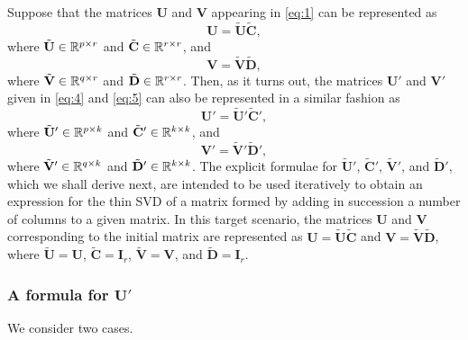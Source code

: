 \documentclass[11pt,a4paper]{article}
\theoremstyle{break}
\numberwithin{dummy}{section}
\theoremstyle{plain}
\theoremstyle{plain}
\theoremstyle{plain}
\theoremstyle{plain}
\theoremstyle{plain}
\theoremstyle{MyNonumberplain}
\newcommand{\0}{\M{0}}
\newcommand{\M}[1]{\mathbf{#1}}
\newcommand{\Mt}[1]{\tilde{\M{#1}}}
\newcommand{\R}{\mathbb{R}}
\newcommand{\Mat}[2]{%
  \ifthenelse{\equal{#2}{1}}
  {\R^{#1}}
  {\R^{#1 \times #2}}
}
\begin{document}
Suppose that the matrices $\M{U}$ and $\M{V}$ appearing in \eqref{eq:1} can be represented as
\begin{equation}
  \label{eq:13}
  \M{U} = \Mt{U} \Mt{C},
 \end{equation}
 where $\Mt{U} \in \Mat{p}{r}$ and $\Mt{C} \in \Mat{r}{r}$, and
\begin{equation}
  \label{eq:14}
  \M{V} = \Mt{V} \Mt{D}, 
 \end{equation}
 where $\Mt{V} \in \Mat{q}{r}$ and $\Mt{D} \in \Mat{r}{r}$.  Then, as it turns out, the matrices $\M{U}'$ and $\M{V}'$ given in \eqref{eq:4} and \eqref{eq:5} can also be represented in a similar fashion as
\begin{equation}
  \label{eq:15}
  \M{U}' = \Mt{U}' \Mt{C}', 
\end{equation}
where $\Mt{U}' \in \Mat{p}{k}$ and $\Mt{C}' \in \Mat{k}{k}$, and
\begin{equation}
  \label{eq:16}
  \M{V}' = \Mt{V}' \Mt{D}', 
\end{equation}
where $\Mt{V}' \in \Mat{q}{k}$ and $\Mt{D}' \in \Mat{k}{k}$.  The explicit formulae for $\Mt{U}'$, $\Mt{C}'$, $\Mt{V}'$, and $\Mt{D}'$, which we shall derive next, are intended to be used iteratively to obtain an expression for the thin SVD of a matrix formed by adding in succession a number of columns to a given matrix. In this target scenario, the matrices $\M{U}$ and $\M{V}$ corresponding to the initial matrix are represented as $\M{U} = \Mt{U} \Mt{C}$ and $\M{V} = \Mt{V} \Mt{D}$, where $\Mt{U} = \M{U}$, $\Mt{C} = \M{I}_r$, $\Mt{V} = \M{V}$, and $\Mt{D} = \M{I}_r$.

\subsubsection{A formula for $\M{U}'$}

We consider two cases.
\end{document}
